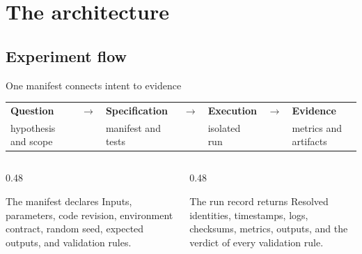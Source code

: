 \section{The architecture}
\subsection{Experiment flow}

\begin{frame}{One manifest connects intent to evidence}
  \centering
  \begin{tabular}{>{\centering\arraybackslash}p{}
                  >{\centering\arraybackslash}p{}
                  >{\centering\arraybackslash}p{}
                  >{\centering\arraybackslash}p{}
                  >{\centering\arraybackslash}p{}
                  >{\centering\arraybackslash}p{}
                  >{\centering\arraybackslash}p{}}
    \color{SzegedBlue}\bfseries Question &
    \color{SzegedGold}$\boldsymbol{\rightarrow}$ &
    \color{SzegedBlue}\bfseries Specification &
    \color{SzegedGold}$\boldsymbol{\rightarrow}$ &
    \color{SzegedBlue}\bfseries Execution &
    \color{SzegedGold}$\boldsymbol{\rightarrow}$ &
    \color{SzegedBlue}\bfseries Evidence \\
    \small hypothesis and scope &&
    \small manifest and tests &&
    \small isolated run &&
    \small metrics and artifacts
  \end{tabular}

  \vspace{0.5cm}

  \begin{columns}[T,onlytextwidth]
    \begin{column}{0.48\textwidth}
      \begin{block}{The manifest declares}
        Inputs, parameters, code revision, environment contract, random seed,
        expected outputs, and validation rules.
      \end{block}
    \end{column}
    \begin{column}{0.48\textwidth}
      \begin{exampleblock}{The run record returns}
        Resolved identities, timestamps, logs, checksums, metrics, outputs, and the
        verdict of every validation rule.
      \end{exampleblock}
    \end{column}
  \end{columns}
\end{frame}

